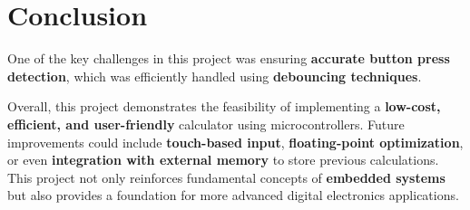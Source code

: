 \documentclass[12pt]{article}
\begin{document}
\section{Conclusion}


One of the key challenges in this project was ensuring \textbf{accurate button press detection}, which was efficiently handled using \textbf{debouncing techniques}.

Overall, this project demonstrates the feasibility of implementing a \textbf{low-cost, efficient, and user-friendly} calculator using microcontrollers. Future improvements could include \textbf{touch-based input}, \textbf{floating-point optimization}, or even \textbf{integration with external memory} to store previous calculations. This project not only reinforces fundamental concepts of \textbf{embedded systems} but also provides a foundation for more advanced digital electronics applications.
\end{document}
